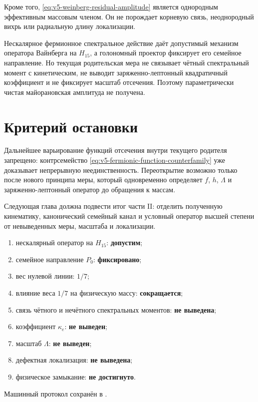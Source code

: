 Кроме того, \eqref{eq:v5-weinberg-residual-amplitude} является однородным
эффективным массовым членом. Он не порождает корневую связь, неоднородный
вихрь или радиальную длину локализации.

\begin{theorem}
Нескалярное фермионное спектральное действие даёт допустимый механизм
оператора Вайнберга на $H_{15}$, а голономный проектор фиксирует его
семейное направление. Но текущая родительская мера не связывает чётный
спектральный момент с кинетическим, не выводит заряженно-лептонный
квадратичный коэффициент и не фиксирует масштаб отсечения. Поэтому
параметрически чистая майорановская амплитуда не получена.
\end{theorem}

\section{Критерий остановки}

Дальнейшее варьирование функций отсечения внутри текущего родителя
запрещено: контрсемейство \eqref{eq:v5-fermionic-function-counterfamily}
уже доказывает непрерывную неединственность. Переоткрытие возможно только
после нового принципа меры, который одновременно определяет $f$, $h$,
$\Lambda$ и заряженно-лептонный оператор до обращения к массам.

Следующая глава должна подвести итог части II: отделить полученную
кинематику, канонический семейный канал и условный оператор высшей степени
от невыведенных меры, масштаба и локализации.

\begin{protocol}
\begin{enumerate}
 \item нескалярный оператор на $H_{15}$: \textbf{допустим};
 \item семейное направление $P_0$: \textbf{фиксировано};
 \item вес нулевой линии: \textbf{$1/7$};
 \item влияние веса $1/7$ на физическую массу: \textbf{сокращается};
 \item связь чётного и нечётного спектральных моментов:
 \textbf{не выведена};
 \item коэффициент $\kappa_e$: \textbf{не выведен};
 \item масштаб $\Lambda$: \textbf{не выведен};
 \item дефектная локализация: \textbf{не выведена};
 \item физическое замыкание: \textbf{не достигнуто}.
\end{enumerate}
\end{protocol}

Машинный протокол сохранён в
.